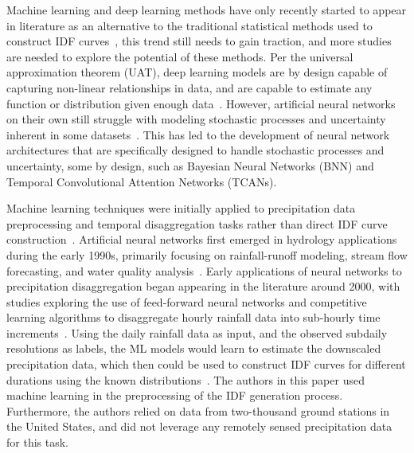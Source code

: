 Machine learning and deep learning methods have only recently started to appear in literature as an alternative to the traditional statistical methods used to construct IDF curves~\cite{idfkoya}, this trend still needs to gain traction, and more studies are needed to explore the potential of these methods. Per the universal approximation theorem (UAT), deep learning models are by design capable of capturing non-linear relationships in data, and are capable to estimate any function or distribution given enough data~\cite{Goodfellow2016-sect6.4.1}. However, artificial neural networks on their own still struggle with modeling stochastic processes and uncertainty inherent in some datasets~\cite{thacker2020fundamentalissuesregardinguncertainties}. This has led to the development of neural network architectures that are specifically designed to handle stochastic processes and uncertainty, some by design, such as Bayesian Neural Networks (BNN) and Temporal Convolutional Attention Networks (TCANs).~\cite{lin2021tcan, goan2020} 

\vspace{1em}

Machine learning techniques were initially applied to precipitation data preprocessing and temporal disaggregation tasks rather than direct IDF curve construction~\cite{geosciences9050209}. Artificial neural networks first emerged in hydrology applications during the early 1990s, primarily focusing on rainfall-runoff modeling, stream flow forecasting, and water quality analysis~\cite{doi:10.1061}. Early applications of neural networks to precipitation disaggregation began appearing in the literature around 2000, with studies exploring the use of feed-forward neural networks and competitive learning algorithms to disaggregate hourly rainfall data into sub-hourly time increments~\cite{geosciences9050209,doi:10.1061}. Using the daily rainfall data as input, and the observed subdaily resolutions as labels, the ML models would learn to estimate the downscaled precipitation data, which then could be used to construct IDF curves for different durations using the known distributions~\cite{geosciences9050209}.
The authors in this paper used machine learning in the preprocessing of the IDF generation process. Furthermore, the authors relied on data from two-thousand ground stations in the United States, and did not leverage any remotely sensed precipitation data for this task.

\vspace{1em}

